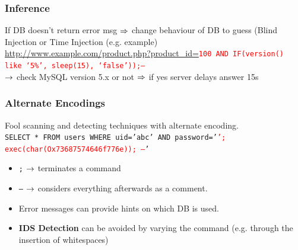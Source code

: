 \documentclass[english, leagacyboxes, nologo]{latex4ei/latex4ei_sheet}
\begin{document}
{    \subsubsection{Inference}
      If DB doesn't return error msg $\Rightarrow$ change behaviour of DB to guess (Blind Injection or Time Injection (e.g. example)\\
      \url{http://www.example.com/product.php?product_id=}\texttt{\textcolor{red}{100 AND IF(version() like ‘5\%’, sleep(15), ‘false’));--}}\\
      $\rightarrow$ check MySQL version 5.x or not $\Rightarrow$ if yes server delays answer 15s


    \subsubsection{Alternate Encodings}
    Fool scanning and detecting techniques with alternate encoding.\\
    \texttt{SELECT * FROM users WHERE uid=’abc’ AND password=’\textcolor{red}{’; exec(char(Ox73687574646f776e)); --}'}

    \begin{itemize}
      \item \texttt{;} $\rightarrow$ terminates a command
      \item \texttt{--} $\rightarrow$ considers everything afterwards as a comment.
      \item Error messages can provide hints on which DB is used.
      \item \textbf{IDS Detection} can be avoided by varying the command (e.g. through the insertion of whitespaces)
    \end{itemize}

  }

\end{document}
